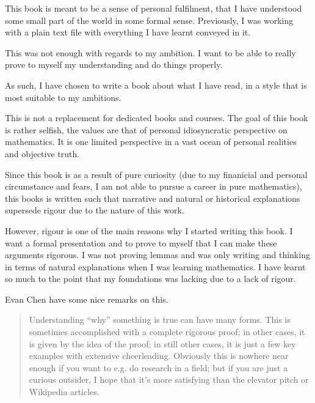 \documentclass{tufte-book}
\newenvironment{docspec}{\begin{quotation}\ttfamily\parskip0pt\parindent0pt\ignorespaces}{\end{quotation}}%
\begin{document}
This book is meant to be a sense of personal fulfilment, that I have understood some small part of the world in some formal sense. Previously, I was working with a plain text file with everything I have learnt conveyed in it.

This was not enough with regards to my ambition. I want to be able to really prove to myself my understanding and do things properly.

As such, I have chosen to write a book about what I have read, in a style that is most suitable to my ambitions.

This is not a replacement for dedicated books and courses. The goal of this book is rather selfish, the values are that of personal idiosyncratic perspective on mathematics. It is one limited perspective in a vast ocean of personal realities and objective truth.

Since this book is as a result of pure curiosity (due to my finanicial and personal circumstance and fears, I am not able to pursue a career in pure mathematics), this books is written such that narrative and natural or historical explanations supersede rigour due to the nature of this work. 

However, rigour is one of the main reasons why I started writing this book. I want a formal presentation and to prove to myself that I can make these arguments rigorous. I was not proving lemmas and was only writing and thinking in terms of natural explanations when I was learning mathematics. I have learnt so much to the point that my foundations was lacking due to a lack of rigour.

Evan Chen have some nice remarks on this. \cite{Chen2025}

\begin{docspec}
Understanding “why” something is true can have many forms. This is sometimes accomplished with a complete rigorous proof; in other cases, it is given by the idea of the proof; in still other cases, it is just a few key examples with extensive cheerleading. Obviously this is nowhere near enough if you want to e.g. do research in a field; but if you are just a curious outsider, I hope that it's more satisfying than the elevator pitch or Wikipedia articles. 
\end{docspec}
\end{document}
